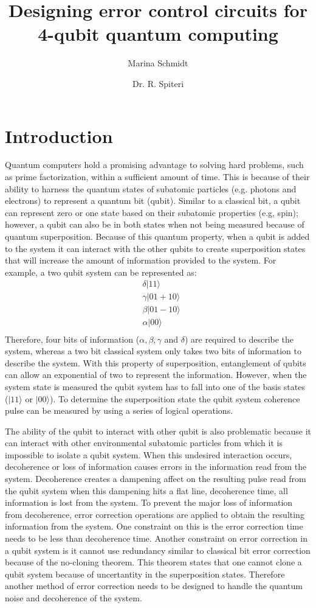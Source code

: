 \documentclass{article}
\title{Designing error control circuits for 4-qubit quantum computing}
\author[1]{Marina Schmidt}
\author[1]{Dr. R. Spiteri}
\affil[1]{Department of Computer Science, University of Saskatchewan}
\affil[ ]{Email: \textit {mts299@mail.usask.ca}}
\affil[ ]{NSID: mts299}
\begin{document}
\maketitle

\section{Introduction}
 Quantum computers hold a promising advantage to solving hard problems, such as prime factorization, within a sufficient amount of time. This is because of their ability to harness the quantum states of subatomic particles (e.g. photons and electrons) to represent a quantum bit (qubit). Similar to a classical bit, a qubit can represent zero or one state based on their subatomic properties (e.g, spin); however, a qubit can also be in both states when not being measured because of quantum superposition. Because of this quantum property, when a qubit is added to the system it can interact with the other qubits to create superposition states that will increase the amount of information provided to the system. For example, a two qubit system can be represented as: 
\begin{align*}
&\delta |11\big\rangle \\ 
&\gamma |01 + 10 \big\rangle \\
&\beta  |01 - 10 \big\rangle \\
&\alpha |00 \big\rangle \\
&\end{align*}
Therefore, four bits of information ($\alpha,\beta,\gamma$ and $\delta$) are required to describe the system, whereas a two bit classical system only takes two bits of information to describe the system. With this property of superposition, entanglement of qubits can allow an exponential of two to represent the information. However, when the system state is measured the qubit system has to fall into one of the basis states ($|11\big\rangle$ or $|00 \big\rangle$). To determine the superposition state the qubit system coherence pulse can be measured by using a series of logical operations. 

The ability of the qubit to interact with other qubit is also problematic because it can interact with other environmental subatomic particles from which it is impossible to isolate a qubit system. When this undesired interaction occurs, decoherence or loss of information causes errors in the information read from the system. Decoherence creates a dampening affect on the resulting pulse read from the qubit system when this dampening hits a flat line, decoherence time, all information is lost from the system. To prevent the major loss of information from decoherence, error correction operations are applied to obtain the resulting information from the system. One constraint on this is the error correction time needs to be less than decoherence time. Another constraint on error correction in a qubit system is it cannot use redundancy similar to classical bit error correction because of the no-cloning theorem. This theorem states that one cannot clone a qubit system because of uncertantity in the superposition states. Therefore another method of error correction needs to be designed to handle the quantum noise and decoherence of the system. 
\end{document}
